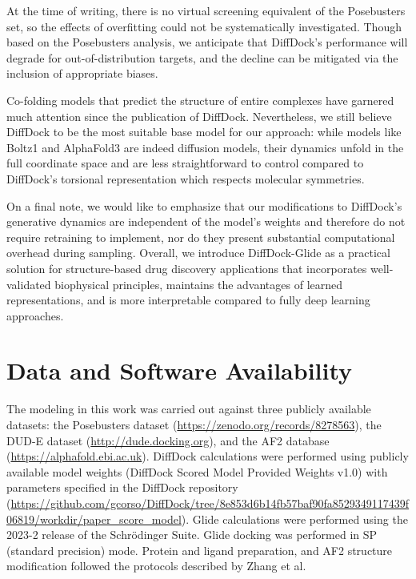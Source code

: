 \documentclass[letterpaper]{article}
\begin{document}
At the time of writing, there is no virtual screening equivalent of the Posebusters set, so the effects of overfitting could not be systematically investigated. Though based on the Posebusters analysis, we anticipate that DiffDock's performance will degrade for out-of-distribution targets, and the decline can be mitigated via the inclusion of appropriate biases. 

Co-folding models that predict the structure of entire complexes have garnered much attention since the publication of DiffDock. Nevertheless, we still believe DiffDock to be the most suitable base model for our approach: while models like Boltz1 \cite{wohlwend2024boltz1} and AlphaFold3\cite{abramson2024af3} are indeed diffusion models, their dynamics unfold in the full coordinate space and are less straightforward to control compared to DiffDock's torsional representation which respects molecular symmetries.

On a final note, we would like to emphasize that our modifications to DiffDock's generative dynamics are independent of the model's weights and therefore do not require retraining to implement, nor do they present substantial computational overhead during sampling. Overall, we introduce DiffDock-Glide as a practical solution for structure-based drug discovery applications that incorporates well-validated biophysical principles, maintains the advantages of learned representations, and is more interpretable compared to fully deep learning approaches. 

\section{Data and Software Availability}
The modeling in this work was carried out against three publicly available datasets: the Posebusters dataset (\url{https://zenodo.org/records/8278563}), the DUD-E dataset (\url{http://dude.docking.org}), and the AF2 database (\url{https://alphafold.ebi.ac.uk}). DiffDock calculations were performed using publicly available model weights (DiffDock Scored Model Provided Weights v1.0) with parameters specified in the DiffDock repository (\url{https://github.com/gcorso/DiffDock/tree/8e853d6b14fb57baf90fa8529349117439f06819/workdir/paper_score_model}). Glide calculations were performed using the 2023-2 release of the Schr\"odinger Suite. Glide docking was performed in SP (standard precision) mode. Protein and ligand preparation, and AF2 structure modification followed the protocols described by Zhang et al.\cite{zhang2023benchmarking}
\end{document}
